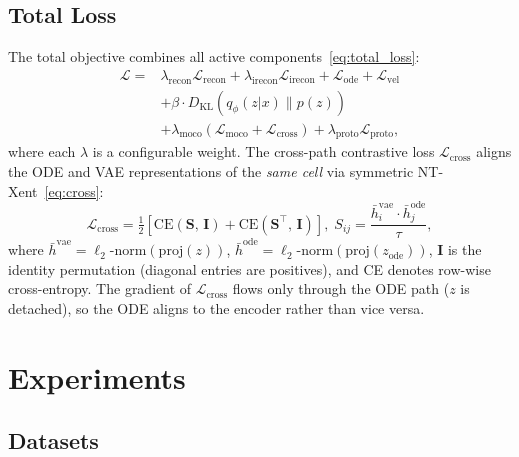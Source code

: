 \documentclass[biology,article,submit,pdftex]{Definitions/mdpi}
\begin{document}
\subsection{Total Loss}
\label{sec:method:loss}

The total objective combines all active components~\eqref{eq:total_loss}:
\begin{align}
    \mathcal{L} ={} & \lambda_{\mathrm{recon}} \mathcal{L}_{\mathrm{recon}} + \lambda_{\mathrm{irecon}} \mathcal{L}_{\mathrm{irecon}} + \mathcal{L}_{\mathrm{ode}} + \mathcal{L}_{\mathrm{vel}} \nonumber \\
    & + \beta \cdot D_{\mathrm{KL}}(q_\phi(z|x) \| p(z)) \nonumber \\
    & + \lambda_{\mathrm{moco}} (\mathcal{L}_{\mathrm{moco}} + \mathcal{L}_{\mathrm{cross}}) + \lambda_{\mathrm{proto}} \mathcal{L}_{\mathrm{proto}},
    \label{eq:total_loss}
\end{align}
where each $\lambda$ is a configurable weight. The cross-path contrastive loss $\mathcal{L}_{\mathrm{cross}}$ aligns the ODE and VAE representations of the \emph{same cell} via symmetric NT-Xent~\eqref{eq:cross}:
\begin{equation}
    \mathcal{L}_{\mathrm{cross}} = \tfrac{1}{2}\!\left[\mathrm{CE}(\mathbf{S},\,\mathbf{I}) + \mathrm{CE}(\mathbf{S}^{\!\top}\!,\,\mathbf{I})\right],\;
    S_{ij} = \frac{\bar{h}^{\mathrm{vae}}_i \cdot \bar{h}^{\mathrm{ode}}_j}{\tau},
    \label{eq:cross}
\end{equation}
where $\bar{h}^{\mathrm{vae}} = \ell_2\text{-norm}(\mathrm{proj}(z))$, $\bar{h}^{\mathrm{ode}} = \ell_2\text{-norm}(\mathrm{proj}(z_{\mathrm{ode}}))$, $\mathbf{I}$ is the identity permutation (diagonal entries are positives), and CE denotes row-wise cross-entropy. The gradient of $\mathcal{L}_{\mathrm{cross}}$ flows only through the ODE path ($z$ is detached), so the ODE aligns to the encoder rather than vice versa.

\section{Experiments}
\label{sec:experiments}

\subsection{Datasets}
\label{sec:experiments:datasets}
\end{document}
